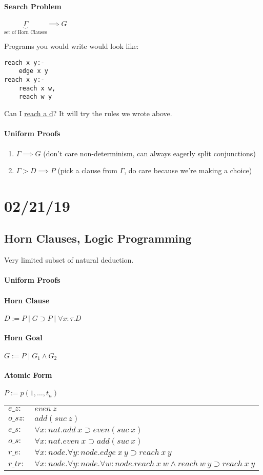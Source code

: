 \documentclass[12 pt]{article}
\begin{document}
	\paragraph{Search Problem} $\underbrace{\Gamma}_{\text{set of
	Horn Clauses}} \implies G$

	Programs you would write would look like:
	\begin{verbatim}
reach x y:-
    edge x y
reach x y:-
    reach x w,
    reach w y
\end{verbatim}
	Can I \underline{reach a d}? It will try the rules we wrote
	above.
	\paragraph{Uniform Proofs}
	\begin{enumerate}
		\item $\Gamma \implies G$ (don't care non-determinism, can
		      always eagerly split conjunctions)
		\item $\Gamma > D \implies P$ (pick a clause from $\Gamma$, do
		      care because we're making a choice)
	\end{enumerate}
	\section{02/21/19}
	\subsection{Horn Clauses, Logic Programming}
	Very limited subset of natural deduction.
	\paragraph{Uniform Proofs}
	\paragraph{Horn Clause} $D := P \mid G \supset P \mid \forall x
: \tau . D$
	\paragraph{Horn Goal} $G := P \mid G_1 \land G_2$
	\paragraph{Atomic Form} $P := p(1, \ldots, t_n)$
	\\
	\begin{tabular}{l l}
		$e\_z:$ & $even\ z$
		\\ $o\_sz:$ & $add(suc\ z)$
		\\ $e\_s:$ & $\forall x:nat. add \ x \supset even (suc\ x)$
		\\ $o\_s:$ & $\forall x : nat. even\ x \supset add(suc\ x)$
		\\ $r\_e:$ & $\forall x: node. \forall y:node . edge\ x\ y \supset reach\ x\ y$
		\\ $r\_tr:$ & $\forall x: node.\forall y: node. \forall w:node. reach\ x \ w \land reach\ w\ y \supset reach\ x \ y$
	\end{tabular}
\end{document}
